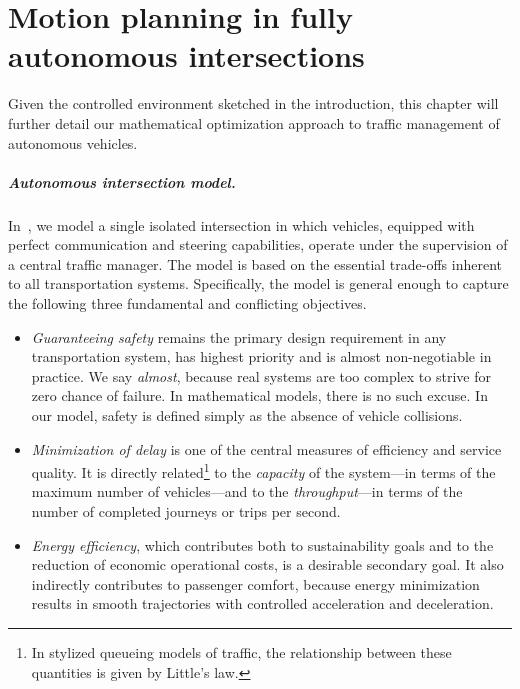 \documentclass[a4paper]{report}
\theoremstyle{definition}
\theoremstyle{plain}
\begin{document}
\chapter{Motion planning in fully autonomous intersections}\label{chap:single}

Given the controlled environment sketched in the introduction, this chapter will
further detail our mathematical optimization approach to traffic management of
autonomous vehicles.

\paragraph{Autonomous intersection model.}
In~, we model a single isolated intersection in which
vehicles, equipped with perfect communication and steering capabilities, operate
under the supervision of a central traffic manager.
%
The model is based on the essential trade-offs inherent to all transportation
systems. Specifically, the model is general enough to capture the following
three fundamental and conflicting objectives.
%
\begin{itemize}
  \item \emph{Guaranteeing safety} remains the primary design requirement in any
        transportation system, has highest priority and is almost non-negotiable
        in practice. We say \emph{almost}, because real systems are too complex
        to strive for zero chance of failure. In mathematical models, there is
        no such excuse. In our model, safety is defined simply as the absence of
        vehicle collisions.

  \item \emph{Minimization of delay} is one of the central measures of efficiency and
        service quality. It is directly related\footnote{In stylized queueing models of traffic, the relationship between these quantities is given by Little's law.} to the \emph{capacity} of the
        system---in terms of the maximum number of vehicles---and to the
        \emph{throughput}---in terms of the number of completed journeys or trips per
        second.

  \item \emph{Energy efficiency}, which contributes both to sustainability goals
        and to the reduction of economic operational costs, is a desirable
        secondary goal. It also indirectly contributes to passenger comfort,
        because energy minimization results in smooth trajectories with
        controlled acceleration and deceleration.
\end{itemize}
\end{document}
